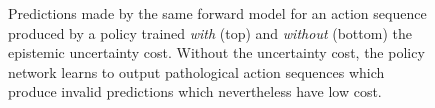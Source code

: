 \documentclass{article} %
\begin{document}
\begin{figure}[t!]
    \centering
    \caption{Predictions made by the same forward model for an action sequence produced by a policy trained \textit{with} (top) and \textit{without} (bottom) the epistemic uncertainty cost. Without the uncertainty cost, the policy network learns to output pathological action sequences which produce invalid predictions which nevertheless have low cost.}
    \label{svg-pred}
\end{figure}

\end{document}
